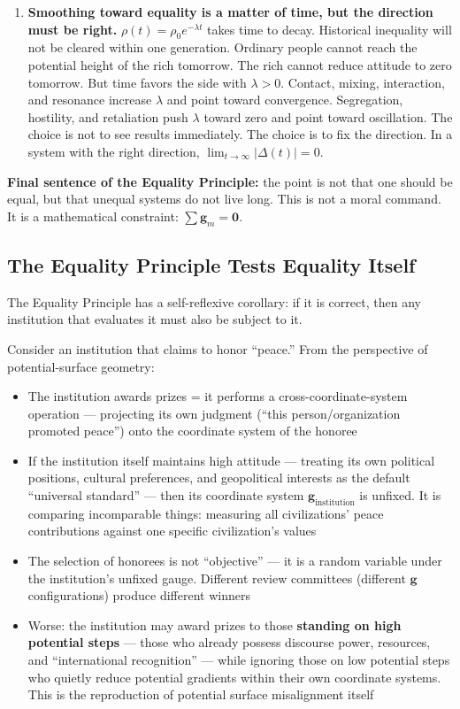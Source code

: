 \documentclass[12pt,a4paper]{article}
\theoremstyle{remark}
\begin{document}
\begin{enumerate}[label=\textbf{(\arabic*)}]
    \item \textbf{Smoothing toward equality is a matter of time, but the direction must be right.} $\rho(t) = \rho_0 e^{-\lambda t}$ takes time to decay. Historical inequality will not be cleared within one generation. Ordinary people cannot reach the potential height of the rich tomorrow. The rich cannot reduce attitude to zero tomorrow. But time favors the side with $\lambda > 0$. Contact, mixing, interaction, and resonance increase $\lambda$ and point toward convergence. Segregation, hostility, and retaliation push $\lambda$ toward zero and point toward oscillation. The choice is not to see results immediately. The choice is to fix the direction. In a system with the right direction, $\lim_{t \to \infty} |\Delta(t)| = 0$.

\end{enumerate}

\textbf{Final sentence of the Equality Principle:} the point is not that one should be equal, but that unequal systems do not live long. This is not a moral command. It is a mathematical constraint: $\sum\mathbf{g}_m = \mathbf{0}$.

\subsection{The Equality Principle Tests Equality Itself}

The Equality Principle has a self-reflexive corollary: if it is correct, then any institution that evaluates it must also be subject to it.

Consider an institution that claims to honor ``peace.'' From the perspective of potential-surface geometry:

\begin{itemize}
    \item The institution awards prizes = it performs a cross-coordinate-system operation --- projecting its own judgment (``this person/organization promoted peace'') onto the coordinate system of the honoree
    \item If the institution itself maintains high attitude --- treating its own political positions, cultural preferences, and geopolitical interests as the default ``universal standard'' --- then its coordinate system $\mathbf{g}_{\text{institution}}$ is unfixed. It is comparing incomparable things: measuring all civilizations' peace contributions against one specific civilization's values
    \item The selection of honorees is not ``objective'' --- it is a random variable under the institution's unfixed gauge. Different review committees (different $\mathbf{g}$ configurations) produce different winners
    \item Worse: the institution may award prizes to those \textbf{standing on high potential steps} --- those who already possess discourse power, resources, and ``international recognition'' --- while ignoring those on low potential steps who quietly reduce potential gradients within their own coordinate systems. This is the reproduction of potential surface misalignment itself
\end{itemize}
\end{document}
